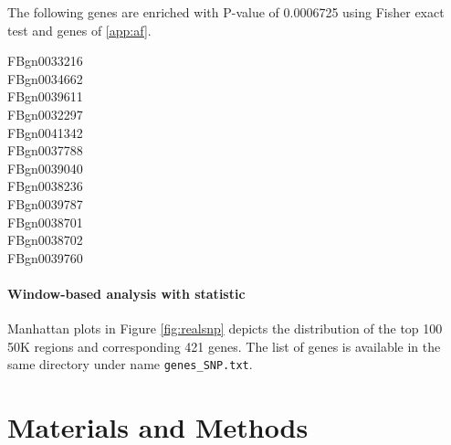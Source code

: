 \documentclass[11pt]{article}
\def\comale{\text{COMALE }}
\begin{document}
The following genes are enriched with P-value of 0.0006725 using Fisher exact test and genes of \ref{app:af}.


	FBgn0033216\\
	FBgn0034662\\
	FBgn0039611\\
	FBgn0032297\\
	FBgn0041342\\
	FBgn0037788\\
	FBgn0039040\\
	FBgn0038236\\
	FBgn0039787\\
	FBgn0038701\\
	FBgn0038702\\
	FBgn0039760

\paragraph{Window-based analysis with \comale statistic}
Manhattan plots in Figure \ref{fig:realsnp} depicts the distribution of the top 100 50K regions and corresponding 421 genes. The list of genes is available in the same directory under name \texttt{genes\_SNP.txt}.

\section{Materials and Methods}
\end{document}
